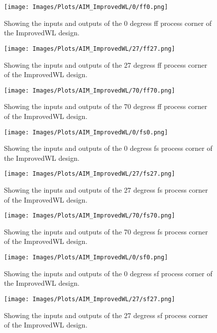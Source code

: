 \begin{figure}[htb] 
    \centering
    \texttt{[image: Images/Plots/AIM\_ImprovedWL/0/ff0.png]} 
    \caption{Showing the inputs and outputs of the 0 degress ff process corner of the ImprovedWL design.} 
    \label{fig:0ffImprovedWL} 
\end{figure}
\begin{figure}[htb] 
    \centering
    \texttt{[image: Images/Plots/AIM\_ImprovedWL/27/ff27.png]} 
    \caption{Showing the inputs and outputs of the 27 degress ff process corner of the ImprovedWL design.} 
    \label{fig:27ffImprovedWL} 
\end{figure}
\newline
\begin{figure}[htb] 
    \centering
    \texttt{[image: Images/Plots/AIM\_ImprovedWL/70/ff70.png]} 
    \caption{Showing the inputs and outputs of the 70 degress ff process corner of the ImprovedWL design.} 
    \label{fig:70ffImprovedWL} 
\end{figure}
\begin{figure}[htb] 
    \centering
    \texttt{[image: Images/Plots/AIM\_ImprovedWL/0/fs0.png]} 
    \caption{Showing the inputs and outputs of the 0 degress fs process corner of the ImprovedWL design.} 
    \label{fig:0fsImprovedWL} 
\end{figure}
\newline
\begin{figure}[htb] 
    \centering
    \texttt{[image: Images/Plots/AIM\_ImprovedWL/27/fs27.png]} 
    \caption{Showing the inputs and outputs of the 27 degress fs process corner of the ImprovedWL design.} 
    \label{fig:27fsImprovedWL} 
\end{figure}
\begin{figure}[htb] 
    \centering
    \texttt{[image: Images/Plots/AIM\_ImprovedWL/70/fs70.png]} 
    \caption{Showing the inputs and outputs of the 70 degress fs process corner of the ImprovedWL design.} 
    \label{fig:70fsImprovedWL} 
\end{figure}
\newline
\begin{figure}[htb] 
    \centering
    \texttt{[image: Images/Plots/AIM\_ImprovedWL/0/sf0.png]} 
    \caption{Showing the inputs and outputs of the 0 degress sf process corner of the ImprovedWL design.} 
    \label{fig:0sfImprovedWL} 
\end{figure}
\begin{figure}[htb] 
    \centering
    \texttt{[image: Images/Plots/AIM\_ImprovedWL/27/sf27.png]} 
    \caption{Showing the inputs and outputs of the 27 degress sf process corner of the ImprovedWL design.} 
    \label{fig:27sfImprovedWL} 
\end{figure}

